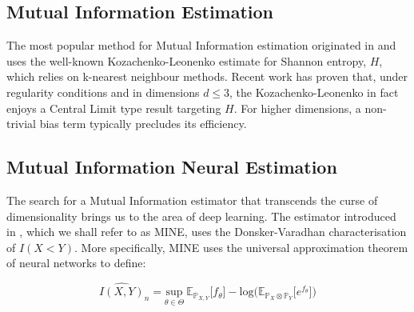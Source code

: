 \documentclass[a4paper]{article}
\begin{document}
\subsection{Mutual Information Estimation}
The most popular method for Mutual Information estimation originated in \citep{Kraskov} and uses the well-known Kozachenko-Leonenko estimate for Shannon entropy, $H$, which relies on k-nearest neighbour methods. Recent work \citep{Berrett} has proven that, under regularity conditions and in dimensions $d\leq3$, the Kozachenko-Leonenko in fact enjoys a Central Limit type result targeting $H$. For higher dimensions, a non-trivial bias term typically precludes its efficiency.

\subsection{Mutual Information Neural Estimation}
The search for a Mutual Information estimator that transcends the curse of dimensionality brings us to the area of deep learning. The estimator introduced in \citep{Belghazi}, which we shall refer to as MINE, uses the Donsker-Varadhan characterisation of $I(X<Y)$. More specifically, MINE uses the universal approximation theorem of neural networks to define:

$$\hat{I(X,Y)}_n=\underset{\theta\in \Theta}{\text{sup}}\ \mathbb{E}_{\mathbb{P}_{X,Y}}\big[f_\theta\big]-\text{log}\big(\mathbb{E}_{\mathbb{P}_{X}\otimes\mathbb{P}_Y}\big[e^{f_\theta}\big]\big) $$



\end{document}
